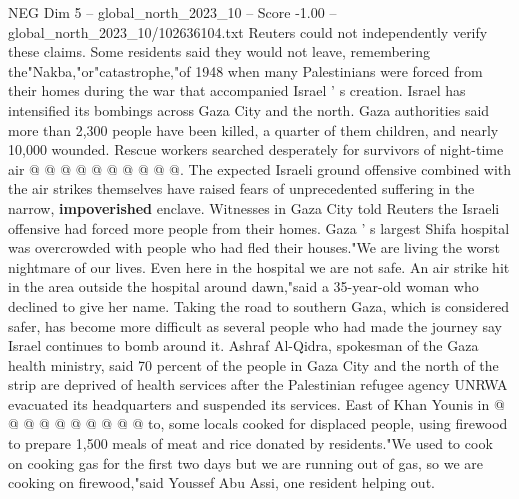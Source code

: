 \begin{textsample}{NEG Dim 5 – global\_north\_2023\_10 – Score -1.00 – global\_north\_2023\_10/102636104.txt}
Reuters could not independently verify these claims.
Some residents said they would not leave, remembering the"Nakba,"or"catastrophe,"of 1948 when many Palestinians were forced from their homes during the war that accompanied Israel ' s creation.
Israel has intensified its bombings across Gaza City and the north.
Gaza authorities said more than 2,300 people have been killed, a quarter of them children, and nearly 10,000 wounded.
Rescue workers searched desperately for survivors of night-time air @ @ @ @ @ @ @ @ @ @.
The expected Israeli ground offensive combined with the air strikes themselves have raised fears of unprecedented suffering in the narrow, \textbf{impoverished} enclave.
Witnesses in Gaza City told Reuters the Israeli offensive had forced more people from their homes.
Gaza ' s largest Shifa hospital was overcrowded with people who had fled their houses."We are living the worst nightmare of our lives.
Even here in the hospital we are not safe.
An air strike hit in the area outside the hospital around dawn,"said a 35-year-old woman who declined to give her name.
Taking the road to southern Gaza, which is considered safer, has become more difficult as several people who had made the journey say Israel continues to bomb around it.
Ashraf Al-Qidra, spokesman of the Gaza health ministry, said 70 percent of the people in Gaza City and the north of the strip are deprived of health services after the Palestinian refugee agency UNRWA evacuated its headquarters and suspended its services.
East of Khan Younis in @ @ @ @ @ @ @ @ @ @ to, some locals cooked for displaced people, using firewood to prepare 1,500 meals of meat and rice donated by residents."We used to cook on cooking gas for the first two days but we are running out of gas, so we are cooking on firewood,"said Youssef Abu Assi, one resident helping out.

\end{textsample}
